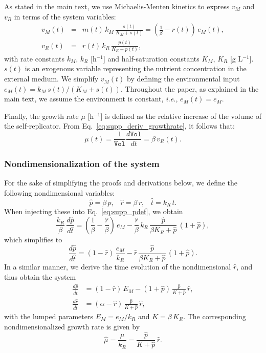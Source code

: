 As stated in the main text, we use Michaelis-Menten kinetics to express $v_M$ and $v_R$ in terms of the system variables:
\begin{eqnarray}
v_M(t) &=& m(t) \, k_M \, \frac{s(t)}{K_M +s(t)} = \left(\frac{1}{\beta} - r(t)\right)\, e_M(t) \nonumber, \\
v_R(t) &=& r(t) \, k_R \, \frac{p(t)}{K_R +p(t)}, \nonumber 
\end{eqnarray}
with rate constants $k_M$, $k_R$ [h$^{-1}$] and half-saturation constants $K_M$, $K_R$ [g L$^{-1}$].
$s(t)$ is an exogenous variable representing the nutrient concentration in the external medium.
We simplify $v_M(t)$ by defining the environmental input $e_M(t) = k_M \, s(t) / (K_M + s(t))$.
Throughout the paper, as explained in the main text, we assume the environment is constant, \textit{i.e.}, $e_M(t)=e_M$.

Finally, the growth rate $\mu$ [h$^{-1}$] is defined as the relative increase of the volume of the self-replicator.
From Eq.~\ref{eq:supp_deriv_growthrate}, it follows that:
\begin{equation}
\label{eq:supp_growthrate}
\mu (t) = \frac{1}{\texttt{Vol}} \frac{d\texttt{Vol}}{dt} = \beta\, v_R(t).
\end{equation}

\subsubsection{Nondimensionalization of the system}

For the sake of simplifying the proofs and derivations below, we define the following nondimensional variables:
\begin{equation*}
\hat{p}  = \beta \, p,\;\;\;
\hat{r}  = \beta \, r,\;\;\;
\hat{t}  = k_R \, t.
\end{equation*}
When injecting these into Eq.~\ref{eq:supp_pdef}, we obtain
\[
\frac{k_R}{\beta} \, \frac{d\hat{p}}{d\hat{t}} = \left( \frac{1}{\beta} - \frac{\hat{r}}{\beta} \right) \, e_M - \frac{\hat{r}}{\beta} \, k_R \, \frac{\hat{p}}{\beta K_R + \hat{p}} \, (1 + \hat{p}),
\]
which simplifies to
\[
\frac{d\hat{p}}{d\hat{t}} = ( 1 - \hat{r} ) \, \frac{e_M}{k_R} - \hat{r} \, \frac{\hat{p}}{\beta K_R + \hat{p}} \, (1 + \hat{p}).
\]
In a similar manner, we derive the time evolution of the nondimensional $\hat{r}$, and thus obtain the system
\begin{equation}
\label{eq:supp_adim}
\begin{aligned}
\frac{d\hat{p}}{d\hat{t}} &= (1-\hat{r})\, E_M - (1 + \hat{p}) \, \frac{\hat{p}}{K + \hat{p}}\, \hat{r},\\
\frac{d\hat{r}}{d\hat{t}} &= (\alpha - \hat{r}) \, \frac{\hat{p}}{K + \hat{p}}\, \hat{r},
\end{aligned}
\end{equation}
with the lumped parameters $E_M = e_M / k_R$ and $K = \beta \, K_R$.
The corresponding nondimensionalized growth rate is given by
\begin{equation}
\label{eq:supp_growthrate_adim}
\hat{\mu} = \frac{\mu}{k_R} = \frac{\hat{p}}{K+\hat{p}} \, \hat{r}.
\end{equation}

